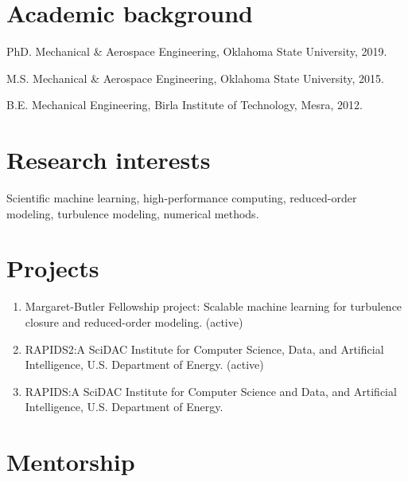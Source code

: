 \documentclass[letterpaper]{article}
\renewenvironment{itemize}{
  \begin{list}{}{
    \setlength{\leftmargin}{1.5em}
  }
}{
  \end{list}
}
\begin{document}
\section*{Academic background}

\begin{itemize}
  \item PhD. Mechanical \& Aerospace Engineering, Oklahoma State University, 2019.
  \item M.S. Mechanical \& Aerospace Engineering, Oklahoma State University, 2015.
  \item B.E. Mechanical Engineering, Birla Institute of Technology, Mesra, 2012. 
\end{itemize}

\section*{Research interests}

Scientific machine learning, high-performance computing, reduced-order modeling, turbulence modeling, numerical methods. 

\section*{Projects}

\begin{enumerate}

  \item Margaret-Butler Fellowship project: Scalable machine learning for turbulence closure and reduced-order modeling. (active)

  \item RAPIDS2:A SciDAC Institute for Computer Science, Data, and Artificial Intelligence, U.S. Department of Energy. (active)

  \item RAPIDS:A SciDAC Institute for Computer Science and Data, and Artificial Intelligence, U.S. Department of Energy.

\end{enumerate}

\section*{Mentorship}
\end{document}
